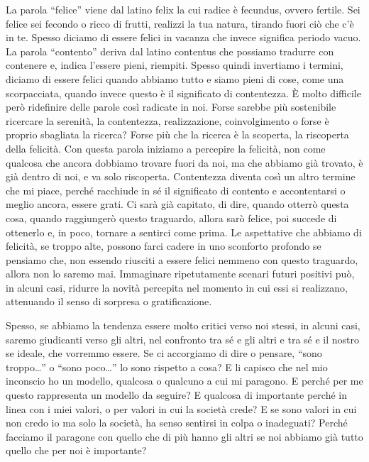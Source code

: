 \documentclass[12pt]{book} %
\begin{document}
La parola “felice” viene dal latino felix la cui radice è fecundus, ovvero fertile. Sei felice sei fecondo o ricco di
frutti, realizzi la tua natura, tirando fuori ciò che c'è in te. Spesso diciamo di essere felici in vacanza che  invece significa periodo vacuo. 
La parola “contento” deriva dal latino contentus che possiamo tradurre con contenere e, indica l'essere pieni, riempiti. Spesso
quindi invertiamo i termini, diciamo di essere felici quando abbiamo tutto e siamo pieni di cose, come una
scorpacciata, quando invece questo è il significato di contentezza. È molto difficile però ridefinire delle parole così
radicate in noi. Forse sarebbe più sostenibile ricercare la serenità, la contentezza, realizzazione, coinvolgimento o forse è proprio sbagliata la
ricerca? Forse più che la ricerca è la scoperta, la riscoperta della felicità. Con questa parola iniziamo a percepire
la felicità, non come qualcosa che ancora dobbiamo trovare fuori da noi, ma che abbiamo già trovato, è già dentro di
noi, e va solo riscoperta. Contentezza diventa così un altro termine che mi
piace, perché racchiude in sé il significato di contento e accontentarsi o meglio ancora, essere grati. Ci sarà già capitato, di
dire, quando otterrò questa cosa, quando raggiungerò questo traguardo, allora sarò felice, poi succede di ottenerlo e, in poco, tornare a sentirci come prima. Le aspettative che abbiamo di felicità, se troppo alte, possono farci
cadere in uno sconforto profondo se pensiamo che, non essendo riusciti a essere felici nemmeno con questo
traguardo, allora non lo saremo mai. Immaginare ripetutamente scenari futuri positivi può, in alcuni casi, ridurre la novità percepita nel momento in cui essi si realizzano, attenuando il senso di sorpresa o gratificazione. 

Spesso, se abbiamo la tendenza essere molto critici verso noi stessi, in alcuni casi, saremo giudicanti verso gli altri, nel
confronto tra sé e gli altri e tra sé e il nostro se ideale, che vorremmo essere. Se ci accorgiamo di dire o pensare,
“sono troppo…” o “sono poco…” lo sono rispetto a cosa? E li capisco che nel mio inconscio ho un modello, qualcosa o
qualcuno a cui mi paragono. E perché per me questo rappresenta un modello da seguire? E qualcosa di importante perché
in linea con i miei valori, o per valori in cui la società crede? E se sono valori in cui non credo io ma solo la
società, ha senso sentirsi in colpa o inadeguati? Perché facciamo il paragone con quello che di più hanno gli altri se
noi abbiamo già tutto quello che per noi è importante?
\end{document}
